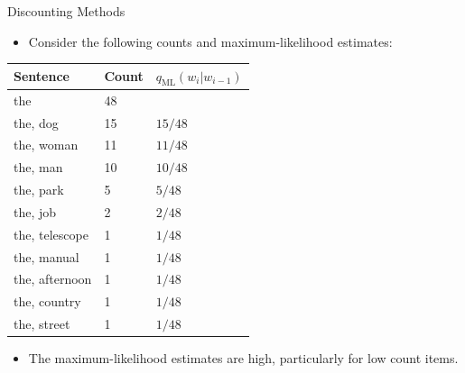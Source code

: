 \documentclass[handout]{beamer}
\begin{document}
\begin{frame}{Discounting Methods}
\begin{scriptsize}
\begin{itemize}
\item Consider the following counts and maximum-likelihood estimates:
\end{itemize}

\begin{table}[h]
    \centering
    \begin{tabular}{lll}
        \textbf{Sentence} & \textbf{Count} & \textbf{$q_{\text{ML}}(w_i | w_{i-1})$} \\
        \hline
        the & 48 & \\
        the, dog & 15 & $15/48$ \\
        the, woman & 11 & $11/48$ \\
        the, man & 10 & $10/48$ \\
        the, park & 5 & $5/48$ \\
        the, job & 2 & $2/48$ \\
        the, telescope & 1 & $1/48$ \\
        the, manual & 1 & $1/48$ \\
        the, afternoon & 1 & $1/48$ \\
        the, country & 1 & $1/48$ \\
        the, street & 1 & $1/48$ \\
    \end{tabular}
\end{table}

\begin{itemize}
    \item The maximum-likelihood estimates are high, particularly for low count items.
\end{itemize}
\end{scriptsize}
\end{frame}
\end{document}
